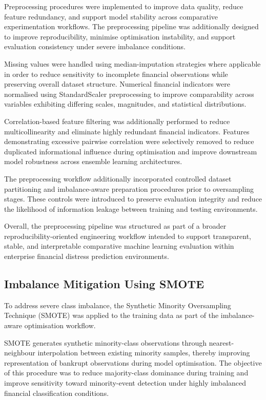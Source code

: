 \documentclass{article}
\begin{document}
Preprocessing procedures were implemented to improve data quality, reduce feature redundancy, and support model stability across comparative experimentation workflows. The preprocessing pipeline was additionally designed to improve reproducibility, minimise optimisation instability, and support evaluation consistency under severe imbalance conditions.

Missing values were handled using median-imputation strategies where applicable in order to reduce sensitivity to incomplete financial observations while preserving overall dataset structure. Numerical financial indicators were normalised using StandardScaler preprocessing to improve comparability across variables exhibiting differing scales, magnitudes, and statistical distributions.

Correlation-based feature filtering was additionally performed to reduce multicollinearity and eliminate highly redundant financial indicators. Features demonstrating excessive pairwise correlation were selectively removed to reduce duplicated informational influence during optimisation and improve downstream model robustness across ensemble learning architectures.

The preprocessing workflow additionally incorporated controlled dataset partitioning and imbalance-aware preparation procedures prior to oversampling stages. These controls were introduced to preserve evaluation integrity and reduce the likelihood of information leakage between training and testing environments.

Overall, the preprocessing pipeline was structured as part of a broader reproducibility-oriented engineering workflow intended to support transparent, stable, and interpretable comparative machine learning evaluation within enterprise financial distress prediction environments.

\subsection{Imbalance Mitigation Using SMOTE}

To address severe class imbalance, the Synthetic Minority Oversampling Technique (SMOTE) \cite{chawla2002smote} was applied to the training data as part of the imbalance-aware optimisation workflow.

SMOTE generates synthetic minority-class observations through nearest-neighbour interpolation between existing minority samples, thereby improving representation of bankrupt observations during model optimisation. The objective of this procedure was to reduce majority-class dominance during training and improve sensitivity toward minority-event detection under highly imbalanced financial classification conditions.
\end{document}
